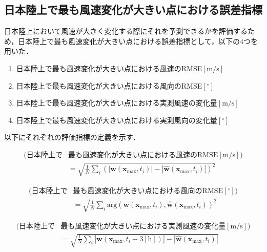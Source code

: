 \subsection{日本陸上で最も風速変化が大きい点における誤差指標 \label{subsec:exp-metrics-at-max-diff-point}}
日本陸上において風速が大きく変化する際にそれを予測できるかを評価するため，日本陸上で最も風速変化が大きい点における誤差指標として，以下の4つを用いた．

\begin{enumerate}
  \item 日本陸上で最も風速変化が大きい点における風速のRMSE$\mathrm{[m/s]}$
  \item 日本陸上で最も風速変化が大きい点における風向のRMSE$\mathrm{[^\circ]}$
  \item 日本陸上で最も風速変化が大きい点における実測風速の変化量$\mathrm{[m/s]}$
  \item 日本陸上で最も風速変化が大きい点における実測風向の変化量$\mathrm{[^\circ]}$
\end{enumerate}

以下にそれぞれの評価指標の定義を示す．

\begin{equation}
  \begin{split}
  (\mathrm{日本陸上で}&\mathrm{最も風速変化が大きい点における風速のRMSE [m/s]}) \\
  & = \sqrt{\frac{1}{N} \sum_{i} (|\bm{w}(\bm{x}_{\mathrm{max}}, t_i)| - |\hat{\bm{w}}(\bm{x}_{\mathrm{max}}, t_i)|)^2}
  \end{split}
  \label{eq:exp-me-at-max-diff-point}
\end{equation}

\begin{equation}
  \begin{split}
    (\mathrm{日本陸上で}&\mathrm{最も風速変化が大きい点における風向のRMSE [^\circ]}) \\
    & = \sqrt{\frac{1}{N} \sum_{i} \mathrm{arg}(\bm{w}(\bm{x}_{\mathrm{max}}, t_i), \hat{\bm{w}}(\bm{x}_{\mathrm{max}}, t_i))^2}
  \end{split}
  \label{eq:exp-rmse-direction-at-max-diff-point}
\end{equation}

\begin{equation}
  \begin{split}
    (\mathrm{日本陸上で}&\mathrm{最も風速変化が大きい点における実測風速の変化量 [m/s]}) \\
    & = \sqrt{\frac{1}{N} \sum_{i} |\hat{\bm{w}}(\bm{x}_{\mathrm{max}}, t_i - 3\mathrm{[h]})| - |\hat{\bm{w}}(\bm{x}_{\mathrm{max}}, t_i)|}
  \end{split}
  \label{eq:exp-speed-diff-at-max-diff-point}
\end{equation}

